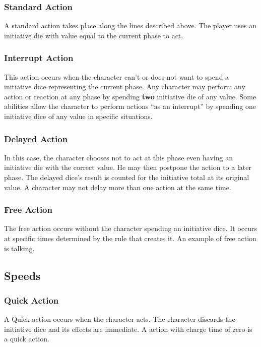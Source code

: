 \begin{multicols}{2}
\subsubsection{Standard Action}
A standard action takes place along the lines described above. The player uses an initiative die with value equal to the current phase to act.

\subsubsection{Interrupt Action}
This action occurs when the character can't or does not want to spend a initiative dice representing the current phase. Any character may perform any action or reaction at any phase by spending \textbf{two} initiative die of any value. Some abilities allow the character to perform actions ``as an interrupt'' by spending one initiative dice of any value in specific situations.

\subsubsection{Delayed Action}
In this case, the character chooses not to act at this phase even having an initiative die with the correct value. He may then postpone the action to a later phase. The delayed dice’s result is counted for the initiative total at its original value. A character may not delay more than one action at the same time.

\subsubsection{Free Action}
The free action occurs without the character spending an initiative dice. It occurs at specific times determined by the rule that creates it. An example of free action is talking.

\subsection{Speeds}\label{subsec:speeds}
\subsubsection{Quick Action}
A Quick action occurs when the character acts. The character discards the initiative dice and its effects are immediate. A action with charge time of zero is a quick action.


\end{multicols}
